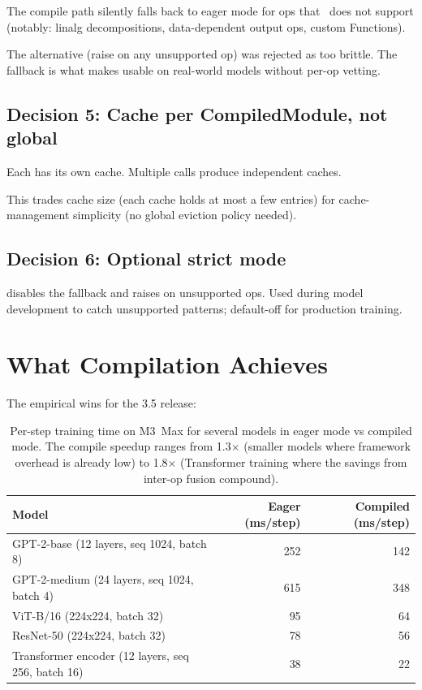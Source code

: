 The compile path silently falls back to eager mode for ops that
\MPSGraph\ does not support (notably: linalg decompositions,
data-dependent output ops, custom Functions).

The alternative (raise on any unsupported op) was rejected as
too brittle. The fallback is what makes  usable
on real-world models without per-op vetting.

\subsection{Decision 5: Cache per CompiledModule, not global}
\label{ssec:compile_design:decision_per_module_cache}

Each  has its own cache. Multiple
 calls produce independent caches.

This trades cache size (each cache holds at most a few entries)
for cache-management simplicity (no global eviction policy
needed).

\subsection{Decision 6: Optional strict mode}
\label{ssec:compile_design:decision_strict}

 disables the fallback
and raises on unsupported ops. Used during model development to
catch unsupported patterns; default-off for production training.

\section{What Compilation Achieves}
\label{sec:compile_design:achievements}

The empirical wins for the 3.5 release:

\begin{table}[t]
\centering
\small
\begin{tabular}{lrr}
\toprule
Model & Eager (ms/step) & Compiled (ms/step) \\
\midrule
GPT-2-base (12 layers, seq 1024, batch 8)  & 252 & 142 \\
GPT-2-medium (24 layers, seq 1024, batch 4) & 615 & 348 \\
ViT-B/16 (224x224, batch 32)               & 95 & 64 \\
ResNet-50 (224x224, batch 32)              & 78 & 56 \\
Transformer encoder (12 layers, seq 256, batch 16) & 38 & 22 \\
\bottomrule
\end{tabular}
\caption[Compile speedups.]{Per-step training time on M3~Max for
several models in eager mode vs compiled mode. The compile
speedup ranges from 1.3$\times$ (smaller models where framework
overhead is already low) to 1.8$\times$ (Transformer training
where the savings from inter-op fusion compound).}
\label{tab:compile_design:speedups}
\end{table}


